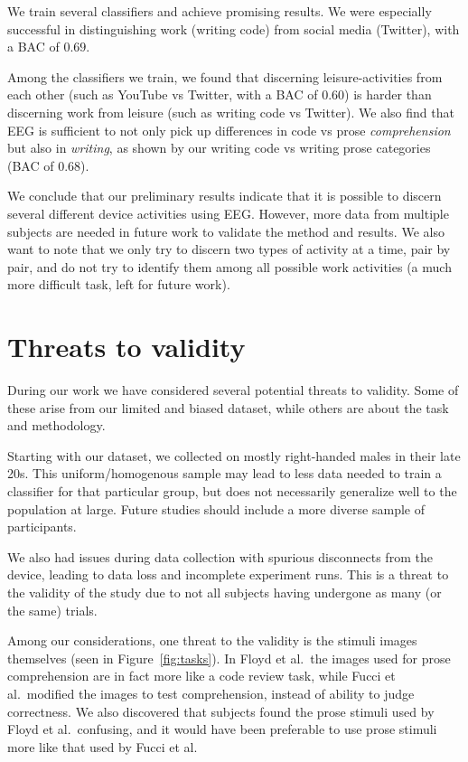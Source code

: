 We train several classifiers and achieve promising results. We were especially successful in distinguishing work (writing code) from social media (Twitter), with a BAC of $0.69$.

Among the classifiers we train, we found that discerning leisure-activities from each other (such as YouTube vs Twitter, with a BAC of $0.60$) is harder than discerning work from leisure (such as writing code vs Twitter). We also find that EEG is sufficient to not only pick up differences in code vs prose \emph{comprehension} but also in \emph{writing}, as shown by our writing code vs writing prose categories (BAC of $0.68$).

We conclude that our preliminary results indicate that it is possible to discern several different device activities using EEG\@. However, more data from multiple subjects are needed in future work to validate the method and results. We also want to note that we only try to discern two types of activity at a time, pair by pair, and do not try to identify them among all possible work activities (a much more difficult task, left for future work).

\section{Threats to validity}\label{section:threats}

    During our work we have considered several potential threats to validity. Some of these arise from our limited and biased dataset, while others are about the task and methodology.

    Starting with our dataset, we collected on mostly right-handed males in their late 20s. This uniform/homogenous sample may lead to less data needed to train a classifier for that particular group, but does not necessarily generalize well to the population at large. Future studies should include a more diverse sample of participants.

    We also had issues during data collection with spurious disconnects from the device, leading to data loss and incomplete experiment runs. This is a threat to the validity of the study due to not all subjects having undergone as many (or the same) trials.

    Among our considerations, one threat to the validity is the stimuli images themselves (seen in Figure~\ref{fig:tasks}). In Floyd et al.~the images used for prose comprehension are in fact more like a code review task, while Fucci et al.~modified the images to test comprehension, instead of ability to judge correctness. We also discovered that subjects found the prose stimuli used by Floyd et al.~confusing, and it would have been preferable to use prose stimuli more like that used by Fucci et al.

